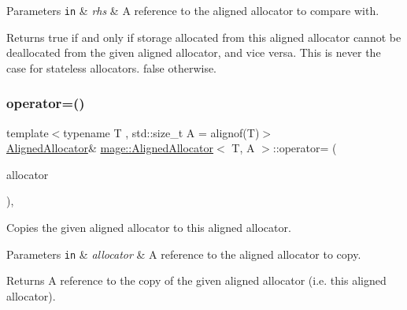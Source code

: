 \begin{DoxyParams}[1]{Parameters}
\mbox{\tt in}  & {\em rhs} & A reference to the aligned allocator to compare with. \\
\hline
\end{DoxyParams}
\begin{DoxyReturn}{Returns}
{\ttfamily true} if and only if storage allocated from this aligned allocator cannot be deallocated from the given aligned allocator, and vice versa. This is never the case for stateless allocators. {\ttfamily false} otherwise. 
\end{DoxyReturn}
\mbox{\label{classmage_1_1_aligned_allocator_afb59c244009982c6f61e4fd7479f40fd}} 
\subsubsection{\texorpdfstring{operator=()}{operator=()}\hspace{0.1cm}{\footnotesize\ttfamily [1/2]}}
{\footnotesize\ttfamily template$<$typename T , std\+::size\+\_\+t A = alignof(\+T)$>$ \\
\mbox{\hyperlink{classmage_1_1_aligned_allocator}{Aligned\+Allocator}}\& \mbox{\hyperlink{classmage_1_1_aligned_allocator}{mage\+::\+Aligned\+Allocator}}$<$ T, A $>$\+::operator= (\begin{DoxyParamCaption}\item[{const \mbox{\hyperlink{classmage_1_1_aligned_allocator}{Aligned\+Allocator}}$<$ T, A $>$ \&}]{allocator }\end{DoxyParamCaption})\hspace{0.3cm}{\ttfamily [default]}, {\ttfamily [noexcept]}}

Copies the given aligned allocator to this aligned allocator.


\begin{DoxyParams}[1]{Parameters}
\mbox{\tt in}  & {\em allocator} & A reference to the aligned allocator to copy. \\
\hline
\end{DoxyParams}
\begin{DoxyReturn}{Returns}
A reference to the copy of the given aligned allocator (i.\+e. this aligned allocator). 
\end{DoxyReturn}
\mbox{\label{classmage_1_1_aligned_allocator_a349db9153bdafabebac1e85836637f2f}} 

